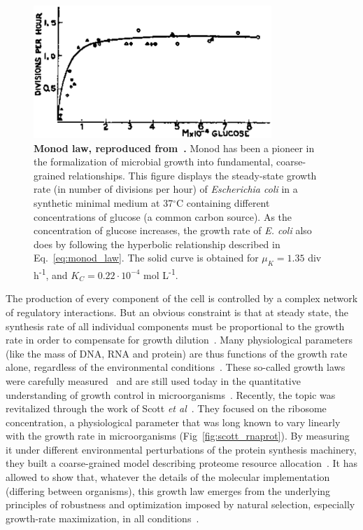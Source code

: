 \begin{figure}[tb]
\centering
\includegraphics[height=5cm]{./Fig/Chapter1/monod_law.eps}
\caption{
\textbf{Monod law, reproduced from~\cite{monod_growth_1949}.}
Monod has been a pioneer in the formalization of microbial growth into fundamental, coarse-grained relationships.
This figure displays the steady-state growth rate (in number of divisions per hour) of \textit{Escherichia coli} in a synthetic minimal medium at 37$^{\circ}$C containing different concentrations of glucose (a common carbon source).
As the concentration of glucose increases, the growth rate of \textit{E. coli} also does by following the hyperbolic relationship described in Eq.~\ref{eq:monod_law}.
The solid curve is obtained for $\mu_K = 1.35$ div h\textsuperscript{-1}, and $K_C = 0.22 \cdot 10^{-4}$ mol L\textsuperscript{-1}.
}
\label{fig:monod_law}
\end{figure}

The production of every component of the cell is controlled by a complex network of regulatory interactions.
But an obvious constraint is that at steady state, the synthesis rate of all individual components must be proportional to the growth rate in order to compensate for growth dilution~\cite{monod_growth_1949}.
Many physiological parameters (like the mass of DNA, RNA and protein) are thus functions of the growth rate alone, regardless of the environmental conditions~\cite{schaechter_dependency_1958,bremer_modulation_1996}.
These so-called growth laws were carefully measured~\cite{bremer_modulation_1996} and are still used today in the quantitative understanding of growth control in microorganisms~\cite{ehrenberg_mediumdependent_2012}.
Recently, the topic was revitalized through the work of Scott \textit{et al}~\cite{scott_bacterial_2011}.
They focused on the ribosome concentration, a physiological parameter that was long known to vary linearly with the growth rate in microorganisms (Fig~\ref{fig:scott_rnaprot}).
By measuring it under different environmental perturbations of the protein synthesis machinery, they built a coarse-grained model describing proteome resource allocation~\cite{scott_emergence_2014}.
It has allowed to show that, whatever the details of the molecular implementation (differing between organisms), this growth law emerges from the underlying principles of robustness and optimization imposed by natural selection, especially growth-rate maximization, in all conditions~\cite{scott_emergence_2014}.


